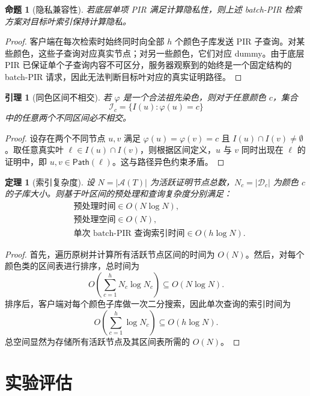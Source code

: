 \documentclass[UTF8]{ctexart}
\newtheorem{theorem}{定理}[section]
\newtheorem{proposition}{命题}[section]
\newtheorem{lemma}{引理}[section]
\begin{document}
	\begin{proposition}[隐私兼容性]
		若底层单项 PIR 满足计算隐私性，则上述 batch-PIR 检索方案对目标叶索引保持计算隐私。
	\end{proposition}
	
	\begin{proof}
		客户端在每次检索时始终同时向全部 $h$ 个颜色子库发送 PIR 子查询。对某些颜色，这些子查询对应真实节点；对另一些颜色，它们对应 dummy。由于底层 PIR 已保证单个子查询内容不可区分，服务器观察到的始终是一个固定结构的 batch-PIR 请求，因此无法判断目标叶对应的真实证明路径。
	\end{proof}
	
	\begin{lemma}[同色区间不相交]
		若 $\varphi$ 是一个合法祖先染色，则对于任意颜色 $c$，集合
		\[
		\mathcal{I}_c=\{I(u): \varphi(u)=c\}
		\]
		中的任意两个不同区间必不相交。
	\end{lemma}
	
	\begin{proof}
		设存在两个不同节点 $u,v$ 满足 $\varphi(u)=\varphi(v)=c$ 且 $I(u)\cap I(v)\neq\emptyset$。取任意真实叶 $\ell \in I(u)\cap I(v)$，则根据区间定义，$u$ 与 $v$ 同时出现在 $\ell$ 的证明中，即 $u,v\in\mathsf{Path}(\ell)$。这与路径异色约束矛盾。
	\end{proof}
	
	\begin{theorem}[索引复杂度]
		设 $N=|\mathcal{A}(T)|$ 为活跃证明节点总数，$N_c=|\mathcal{D}_c|$ 为颜色 $c$ 的子库大小。则基于叶区间的预处理和查询复杂度分别满足：
		\begin{align*}
			&\text{预处理时间} \in O(N\log N),\\
			&\text{预处理空间} \in O(N),\\
			&\text{单次 batch-PIR 查询索引时间} \in O(h\log N).
		\end{align*}
	\end{theorem}
	
	\begin{proof}
		首先，遍历原树并计算所有活跃节点区间的时间为 $O(N)$。然后，对每个颜色类的区间表进行排序，总时间为
		\[
		O\!\left(\sum_{c=1}^{h}N_c\log N_c\right)\subseteq O(N\log N).
		\]
		排序后，客户端对每个颜色子库做一次二分搜索，因此单次查询的索引时间为
		\[
		O\!\left(\sum_{c=1}^{h}\log N_c\right)\subseteq O(h\log N).
		\]
		总空间显然为存储所有活跃节点及其区间表所需的 $O(N)$。
	\end{proof}
	
	\section{实验评估}
	
\end{document}
